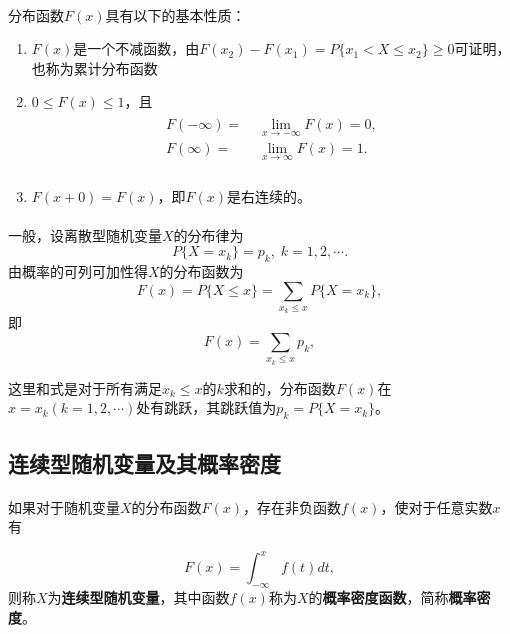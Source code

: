 \paragraph{}
分布函数$F(x)$具有以下的基本性质：

\begin{enumerate}
  \item $F(x)$是一个不减函数，由$F(x_2) - F(x_1) = P\{x_1 < X \leq x_2\} \geq 0$可证明，也称为累计分布函数
  \item $0 \leq F(x) \leq 1$，且
  \begin{align}
    \begin{split}
      F(-\infty) =&\; \lim_{x \to -\infty}F(x) = 0, \\
      F(\infty) =&\; \lim_{x \to \infty}F(x) = 1. \\
    \end{split}
  \end{align}
  \item $F(x+0) = F(x)$，即$F(x)$是右连续的。
\end{enumerate}

\paragraph{}
一般，设离散型随机变量$X$的分布律为
\begin{equation}
  P\{X=x_k\}=p_k, \; k = 1,2,\cdots.
\end{equation}
由概率的可列可加性得$X$的分布函数为
\begin{equation}
  F(x) = P\{X \leq  x\} = \sum_{x_k \leq x} P\{X = x_k\},
\end{equation}
即
\begin{equation}
  \label{X的分布函数}
  F(x) = \sum_{x_k \leq x}p_k,
\end{equation}

这里和式是对于所有满足$x_k \leq x$的$k$求和的，分布函数$F(x)$在$x=x_k(k=1,2,\cdots)$处有跳跃，其跳跃值为$p_k=P\{X=x_k\}$。

\subsection{连续型随机变量及其概率密度}
\paragraph{}
如果对于随机变量$X$的分布函数$F(x)$，存在非负函数$f(x)$，使对于任意实数$x$有

\begin{equation}
  \label{连续型随机变量的分布函数}
  F(x) = \int_{-\infty}^{x}f(t)dt,
\end{equation}
则称$X$为\textbf{连续型随机变量}，其中函数$f(x)$称为$X$的\textbf{概率密度函数}，简称\textbf{概率密度}。

